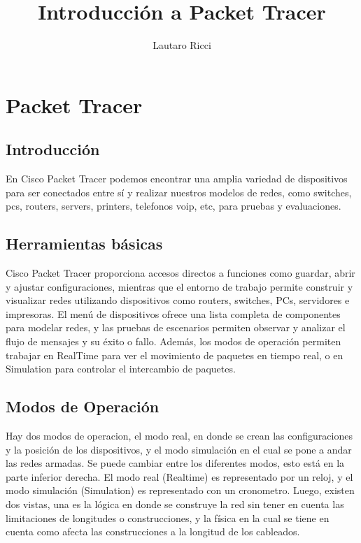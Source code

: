 \documentclass[]{article}
\title{Introducción a Packet Tracer}
\author{Lautaro Ricci}
\begin{document}
	
	\maketitle

\section{Packet Tracer}
	\subsection{Introducción}
	En Cisco Packet Tracer podemos encontrar una amplia variedad de dispositivos para ser conectados entre sí y realizar nuestros modelos de redes, como switches, pcs, routers, servers, printers, telefonos voip, etc, para pruebas y evaluaciones.
	\subsection{Herramientas básicas}
	Cisco Packet Tracer proporciona accesos directos a funciones como guardar, abrir y ajustar configuraciones, mientras que el entorno de trabajo permite construir y visualizar redes utilizando dispositivos como routers, switches, PCs, servidores e impresoras. El menú de dispositivos ofrece una lista completa de componentes para modelar redes, y las pruebas de escenarios permiten observar y analizar el flujo de mensajes y su éxito o fallo. Además, los modos de operación permiten trabajar en RealTime para ver el movimiento de paquetes en tiempo real, o en Simulation para controlar el intercambio de paquetes.	
	\\
	\subsection{Modos de Operación}	
	Hay dos modos de operacion, el modo real, en donde se crean las configuraciones y la posición de los dispositivos, y el modo simulación en el cual se pone a andar las redes armadas. Se puede cambiar entre los diferentes modos, esto está en la parte inferior derecha. El modo real (Realtime) es representado por un reloj, y el modo simulación (Simulation) es representado con un cronometro. Luego, existen dos vistas, una es la lógica en donde se construye la red sin tener en cuenta las limitaciones de longitudes o construcciones, y la física en la cual se tiene en cuenta como afecta las construcciones a la longitud de los cableados.
\\
\\	 
\end{document}
